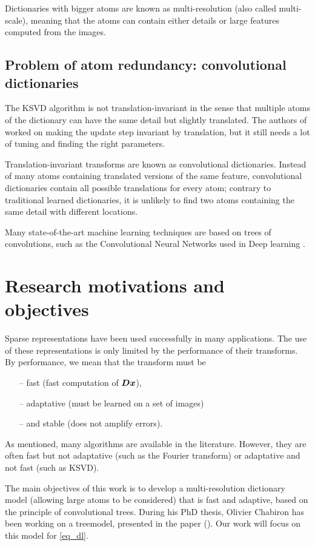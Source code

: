 \noindent
Dictionaries with bigger atoms are known as multi-resolution (also called multi-scale), meaning that the atoms can contain either details or large features computed from the images.


\subsection{Problem of atom redundancy: convolutional dictionaries}\label{sec_atoms_redund}
The \ac{KSVD} algorithm is not translation-invariant in the sense that multiple atoms of the dictionary can have the same detail but slightly translated. The authors of \cite{mailhe_shift-invariant_2008} worked on making the update step invariant by translation, but it still needs a lot of tuning and finding the right parameters.

\noindent
Translation-invariant transforms are known as convolutional dictionaries. Instead of many atoms containing translated versions of the same feature, convolutional dictionaries contain all possible translations for every atom; contrary to traditional learned dictionaries, it is unlikely to find two atoms containing the same detail with different locations.

\noindent
Many state-of-the-art machine learning techniques are based on trees of convolutions, such as the Convolutional Neural Networks used in Deep learning \cite{lecun_deep_2015}.

\section{Research motivations and objectives}
Sparse representations have been used successfully in many applications. The use of these representations is only limited by the performance of their transforms. By performance, we mean that the transform must be
\begin{itemize}
\item[--] fast (fast computation of $\bm{D}\bm{x}$),
\item[--] adaptative (must be learned on a set of images)
\item[--] and stable (does not amplify errors).
\end{itemize}

\noindent
As mentioned, many algorithms are available in the literature. However, they are often fast but not adaptative (such as the Fourier transform) or adaptative and not fast (such as \ac{KSVD}).

\noindent
The main objectives of this work is to develop a multi-resolution dictionary model (allowing large atoms to be considered) that is fast and adaptive, based on the principle of convolutional trees. During his PhD thesis, Olivier Chabiron has been working on a \Gls{treemodel}, presented in the paper  (\cite{chabiron_optimization_2016}). Our work will focus on this model for \eqref{eq_dl}.


